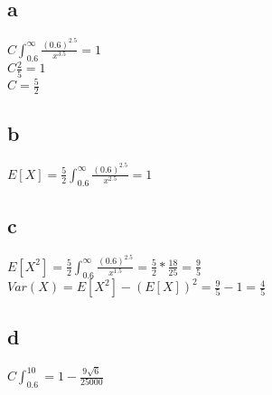 \documentclass[12pt]{article}
\begin{document}
\section{}
\subsection*{a}
\(C \int_{0.6}^{\infty} \frac{(0.6)^{2.5}}{x^{3.5}} = 1\)\\
\(C \frac{2}{5} = 1\)\\
\(C = \frac{5}{2}\)\\
\subsection*{b}
\(E[X] = \frac{5}{2} \int_{0.6}^{\infty} \frac{(0.6)^{2.5}}{x^{2.5}} = 1\)
\subsection*{c}
\(E[X^2] = \frac{5}{2} \int_{0.6}^{\infty} \frac{(0.6)^{2.5}}{x^{1.5}} = \frac{5}{2} * \frac{18}{25} = \frac{9}{5}\)\\
\(Var(X) = E[X^2] - (E[X])^2 = \frac{9}{5} - 1 = \frac{4}{5}\)
\subsection*{d}
\(C \int_{0.6}^{10} = 1 - \frac{9\sqrt{6}}{25000}\)
\end{document}
